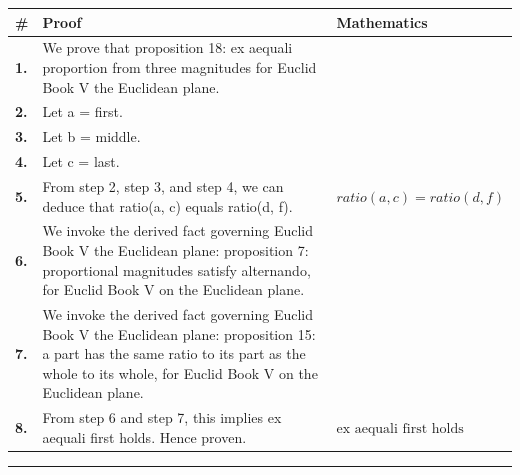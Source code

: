 \documentclass[11pt]{article}
\theoremstyle{definition}
\begin{document}
\begin{tabular}{@{} >{\raggedright\arraybackslash}p{} >{\raggedright\arraybackslash}p{} >{\raggedleft\arraybackslash}p{} @{}}
\textbf{\#} & \textbf{Proof} & \textbf{Mathematics} \\
\midrule
\textbf{1.} & We prove that proposition 18: ex aequali proportion from three magnitudes for Euclid Book V the Euclidean plane. & \\[0.45em]
\textbf{2.} & Let a = first. & \\[0.45em]
\textbf{3.} & Let b = middle. & \\[0.45em]
\textbf{4.} & Let c = last. & \\[0.45em]
\textbf{5.} & From step 2, step 3, and step 4, we can deduce that ratio(a, c) equals ratio(d, f). & $\displaystyle ratio(a, c) = ratio(d, f)$ \\[0.45em]
\textbf{6.} & We invoke the derived fact governing Euclid Book V the Euclidean plane: proposition 7: proportional magnitudes satisfy alternando, for Euclid Book V on the Euclidean plane. & \\[0.45em]
\textbf{7.} & We invoke the derived fact governing Euclid Book V the Euclidean plane: proposition 15: a part has the same ratio to its part as the whole to its whole, for Euclid Book V on the Euclidean plane. & \\[0.45em]
\textbf{8.} & From step 6 and step 7, this implies ex aequali first holds. Hence proven. & $\displaystyle \text{ex aequali first holds}$ \\[0.45em]
\bottomrule
\end{tabular}
\label{thm:Geometry-Euclid Book V-proposition_18_ex_aequali_proportion_from_three_magnitudes}
\par\medskip\hrule
\end{document}
